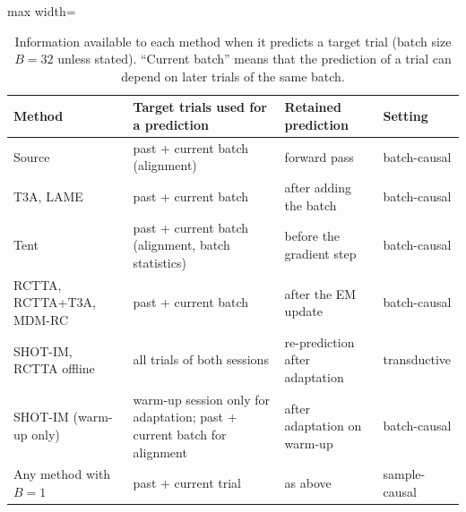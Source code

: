 \documentclass[preprint,12pt]{elsarticle}
\newcommand{\rev}[1]{#1}
\newcommand{\revfloat}{}
\begin{document}
\begin{table}[!htbp]
\centering
\caption{\rev{Information available to each method when it predicts a target trial (batch size $B=32$ unless stated). ``Current batch'' means that the prediction of a trial can depend on later trials of the same batch.}}
\label{tab:access}
\revfloat
\setlength{\tabcolsep}{3pt}
\begin{adjustbox}{max width=\textwidth}
\begin{tabular}{@{}>{\raggedright\arraybackslash}p{2.6cm}>{\raggedright\arraybackslash}p{4.4cm}>{\raggedright\arraybackslash}p{3.5cm}>{\raggedright\arraybackslash}p{2.6cm}@{}}
\toprule
Method & Target trials used for a prediction & Retained prediction & Setting \\
\midrule
Source & past + current batch (alignment) & forward pass & batch-causal \\
T3A, LAME & past + current batch & after adding the batch & batch-causal \\
Tent & past + current batch (alignment, batch statistics) & before the gradient step & batch-causal \\
RCTTA, RCTTA+T3A, MDM-RC & past + current batch & after the EM update & batch-causal \\
SHOT-IM, RCTTA offline & all trials of both sessions & re-prediction after adaptation & transductive \\
SHOT-IM (warm-up only) & warm-up session only for adaptation; past + current batch for alignment & after adaptation on warm-up & batch-causal \\
Any method with $B=1$ & past + current trial & as above & sample-causal \\
\bottomrule
\end{tabular}
\end{adjustbox}
\end{table}
\end{document}
